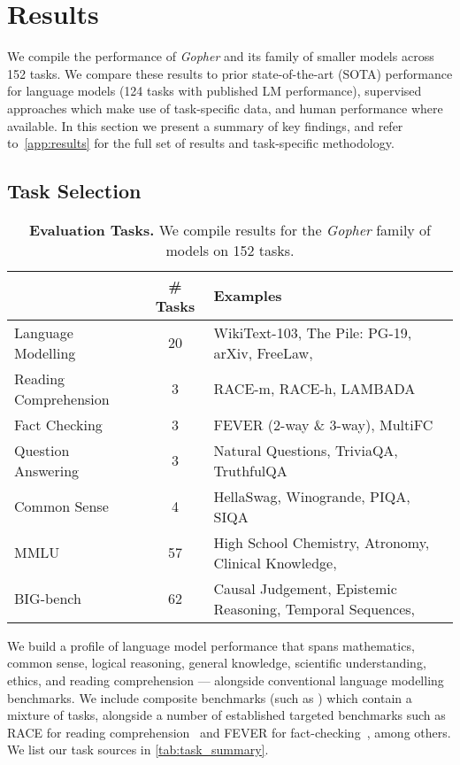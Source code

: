 \documentclass[11pt, a4paper, logo, internal, copyright, nonumbering]{deepmind}
\newcommand{\gopher}{\textit{Gopher}\xspace}
\newcommand{\bigbench}{BIG-bench\xspace}
\begin{document}
\section{Results}
\label{sec:results}
We compile the performance of \gopher and its family of smaller models across 152 tasks. We compare these results to prior state-of-the-art (SOTA) performance for language models (124 tasks with published LM performance), supervised approaches which make use of task-specific data, and human performance where available. In this section we present a summary of key findings, and refer to~\autoref{app:results} for the full set of results and task-specific methodology.  

\subsection{Task Selection}
\begin{table}
    \centering
    \begin{tabular}{l c l}
    \toprule
        & \# Tasks & Examples \\
    \midrule
    Language Modelling & 20  & {\small WikiText-103, The Pile: PG-19, arXiv, FreeLaw, } \\ 
    Reading Comprehension & 3 & {\small RACE-m, RACE-h, LAMBADA} \\
    Fact Checking & 3 & {\small FEVER (2-way \& 3-way), MultiFC} \\
    Question Answering & 3 & {\small Natural Questions, TriviaQA, TruthfulQA} \\
    Common Sense & 4 & {\small HellaSwag, Winogrande, PIQA, SIQA} \\
    MMLU & 57 & {\small High School Chemistry, Atronomy, Clinical Knowledge, } \\
    \bigbench & 62 & {\small Causal Judgement, Epistemic Reasoning, Temporal Sequences, }  \\
    \bottomrule
    \end{tabular}
    \caption{\textbf{Evaluation Tasks.} We compile results for the \gopher family of models on 152 tasks.}
    \label{tab:task_summary}
\end{table}

We build a profile of language model performance that spans mathematics, common sense, logical reasoning, general knowledge, scientific understanding, ethics, and reading comprehension --- alongside conventional language modelling benchmarks. 
We include composite benchmarks (such as \citet{bigbench}) which contain a mixture of tasks, alongside a number of established targeted benchmarks such as RACE for reading comprehension~\citep{race} and FEVER for fact-checking~\citep{fever}, among others. We list our task sources in \autoref{tab:task_summary}.
\end{document}
